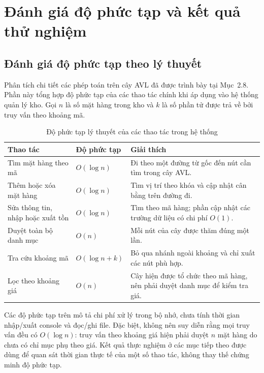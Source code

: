 \chapter{Đánh giá độ phức tạp và kết quả thử nghiệm}

\section{Đánh giá độ phức tạp theo lý thuyết}
Phân tích chi tiết các phép toán trên cây AVL đã được trình bày tại Mục~2.8. Phần này tổng hợp độ phức tạp của các thao tác chính khi áp dụng vào hệ thống quản lý kho. Gọi $n$ là số mặt hàng trong kho và $k$ là số phần tử được trả về bởi truy vấn theo khoảng mã.

\begin{table}[H]
\centering
\caption{Độ phức tạp lý thuyết của các thao tác trong hệ thống}
\label{tab:complexity_system_ch4}
\small
\begin{tabular}{@{}p{4.0cm}p{2.5cm}p{6.0cm}@{}}
\toprule
\textbf{Thao tác} & \textbf{Độ phức tạp} & \textbf{Giải thích} \\
\midrule
Tìm mặt hàng theo mã & $O(\log n)$ & Đi theo một đường từ gốc đến nút cần tìm trong cây AVL. \\
Thêm hoặc xóa mặt hàng & $O(\log n)$ & Tìm vị trí theo khóa và cập nhật cân bằng trên đường đi. \\
Sửa thông tin, nhập hoặc xuất tồn & $O(\log n)$ & Tìm theo mã hàng; phần cập nhật các trường dữ liệu có chi phí $O(1)$. \\
Duyệt toàn bộ danh mục & $O(n)$ & Mỗi nút của cây được thăm đúng một lần. \\
Tra cứu khoảng mã & $O(\log n + k)$ & Bỏ qua nhánh ngoài khoảng và chỉ xuất các nút phù hợp. \\
Lọc theo khoảng giá & $O(n)$ & Cây hiện được tổ chức theo mã hàng, nên phải duyệt danh mục để kiểm tra giá. \\
\bottomrule
\end{tabular}
\end{table}

Các độ phức tạp trên mô tả chi phí xử lý trong bộ nhớ, chưa tính thời gian nhập/xuất console và đọc/ghi file. Đặc biệt, không nên suy diễn rằng mọi truy vấn đều có $O(\log n)$: truy vấn theo khoảng giá hiện phải duyệt $n$ mặt hàng do chưa có chỉ mục phụ theo giá. Kết quả thực nghiệm ở các mục tiếp theo được dùng để quan sát thời gian thực tế của một số thao tác, không thay thế chứng minh độ phức tạp.

